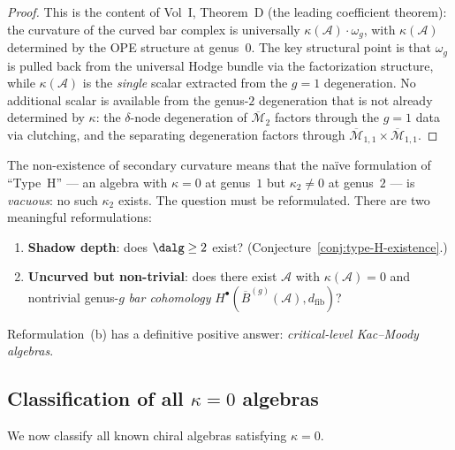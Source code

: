 \documentclass[11pt]{article}
\newcommand{\cA}{\mathcal{A}}
\newcommand{\cM}{\mathcal{M}}
\newcommand{\barB}{\overline{B}}
\newcommand{\dfib}{d_{\mathrm{fib}}}
\begin{document}
\begin{proof}
This is the content of Vol~I, Theorem~D (the leading coefficient
theorem): the curvature of the curved bar complex is universally
$\kappa(\cA) \cdot \omega_g$, with $\kappa(\cA)$ determined by the
OPE structure at genus~$0$.  The key structural point is that
$\omega_g$ is pulled back from the universal Hodge bundle via the
factorization structure, while $\kappa(\cA)$ is the \emph{single}
scalar extracted from the $g = 1$ degeneration.  No additional
scalar is available from the genus-$2$ degeneration that is not
already determined by $\kappa$: the $\delta$-node degeneration
of $\overline{\cM}_2$ factors through the $g = 1$ data via
clutching, and the separating degeneration factors through
$\overline{\cM}_{1,1} \times \overline{\cM}_{1,1}$.
\end{proof}

\begin{remark}
\label{rem:type-H-curvature-distinction}
The non-existence of secondary curvature means that the na\"ive
formulation of ``Type~H'' --- an algebra with $\kappa = 0$ at
genus~$1$ but $\kappa_2 \neq 0$ at genus~$2$ --- is
\emph{vacuous}: no such $\kappa_2$ exists.  The question must be
reformulated.  There are two meaningful reformulations:
\begin{enumerate}[label=\textup{(\alph*)}]
\item \textbf{Shadow depth}: does $\dalg \geq 2$ exist?
  (Conjecture~\ref{conj:type-H-existence}.)
\item \textbf{Uncurved but non-trivial}: does there exist
  $\cA$ with $\kappa(\cA) = 0$ and nontrivial genus-$g$
  \emph{bar cohomology} $H^\bullet(\barB^{(g)}(\cA), \dfib)$?
\end{enumerate}
Reformulation~(b) has a definitive positive answer:
\emph{critical-level Kac--Moody algebras}.
\end{remark}

\subsection{Classification of all $\kappa = 0$ algebras}

We now classify all known chiral algebras satisfying $\kappa = 0$.
\end{document}
